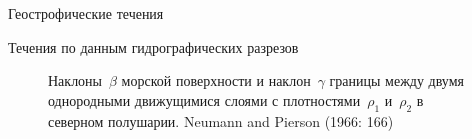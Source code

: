 \begin{chapter}{Геострофические течения}
\begin{section}{Течения по данным гидрографических разрезов}
\begin{figure}[t!]
\caption{Наклоны~$\beta$ морской поверхности и наклон~$\gamma$
границы между двумя однородными движущимися слоями с плотностями~$\rho_1$ 
и~$\rho_2$ в северном полушарии. Neumann and Pierson (1966: 166)}
\label{fig:Fig10-10}
\vspace{-3ex}
\end{figure}
%
%


\end{section}
\end{chapter}
